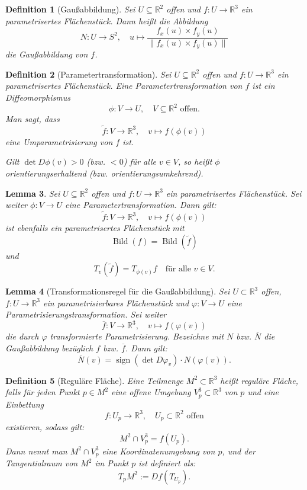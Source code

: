 \documentclass[a4paper,12pt]{article}
\theoremstyle{break}
\newtheorem{definition}{Definition}[section]
\newtheorem{lemma}[definition]{Lemma}
\begin{document}
\begin{definition}[Gaußabbildung]
    Sei \( U \subseteq \mathbb{R}^2 \) offen und \( f: U \to \mathbb{R}^3 \) ein parametrisertes Flächenstück. 
    Dann heißt die Abbildung
    \[
        N: U \to S^2, \quad u \mapsto \frac{f_x(u) \times f_y(u)}{\| f_x(u) \times f_y(u) \|}
    \]
    die \emph{Gaußabbildung} von \( f \).
\end{definition}

\begin{definition}[Parametertransformation]
    Sei \( U \subseteq \mathbb{R}^2 \) offen und \( f: U \to \mathbb{R}^3 \) ein parametrisertes Flächenstück. 
    Eine \emph{Parametertransformation} von \( f \) ist ein Diffeomorphismus 
    \[
        \phi: V \to U, \quad V \subseteq \mathbb{R}^2 \text{ offen}.
    \]
    Man sagt, dass 
    \[
        \tilde{f}: V \to \mathbb{R}^3, \quad v \mapsto f(\phi(v))
    \]
    eine \emph{Umparametrisierung} von \( f \) ist.
    
    Gilt \( \det D\phi(v) > 0 \) (bzw. \( < 0 \)) für alle \( v \in V \), so heißt \( \phi \) \emph{orientierungserhaltend} (bzw. \emph{orientierungsumkehrend}).
\end{definition}

\begin{lemma}
    Sei \( U \subseteq \mathbb{R}^2 \) offen und \( f: U \to \mathbb{R}^3 \) ein parametrisertes Flächenstück.
    Sei weiter \( \phi: V \to U \) eine Parametertransformation. Dann gilt:
    \[
        \tilde{f}: V \to \mathbb{R}^3, \quad v \mapsto f(\phi(v))
    \]
    ist ebenfalls ein parametrisertes Flächenstück mit 
    \[
        \operatorname{Bild}(f) = \operatorname{Bild}(\tilde{f})
    \]
    und 
    \[
        T_v(\tilde{f}) = T_{\phi(v)} f \quad \text{für alle } v \in V.
    \]
\end{lemma}

\begin{lemma}[Transformationsregel für die Gaußabbildung]
Sei $U \subset \mathbb{R}^3$ offen, $f: U \to \mathbb{R}^3$ ein parametrisierbares Flächenstück und $\varphi: V \to U$ eine Parametrisierungstransformation. Sei weiter 
\[
\overline{f}: V \to \mathbb{R}^3, \quad v \mapsto f(\varphi(v))
\]
die durch $\varphi$ transformierte Parametrisierung. Bezeichne mit $N$ bzw. $\overline{N}$ die Gaußabbildung bezüglich $f$ bzw. $\overline{f}$. Dann gilt:
\[
\overline{N}(v) = \operatorname{sign}(\det D\varphi_v) \cdot N(\varphi(v)).
\]
\end{lemma}

\begin{definition}[Reguläre Fläche]
Eine Teilmenge $M^2 \subset \mathbb{R}^3$ heißt \emph{reguläre Fläche}, falls für jeden Punkt $p \in M^2$ eine offene Umgebung $V_p^3 \subset \mathbb{R}^3$ von $p$ und eine Einbettung 
\[
f: U_p \to \mathbb{R}^3, \quad U_p \subset \mathbb{R}^2 \text{ offen}
\]
existieren, sodass gilt:
\[
M^2 \cap V_p^3 = f(U_p).
\]
Dann nennt man $M^2 \cap V_p^3$ eine \emph{Koordinatenumgebung} von $p$, und der Tangentialraum von $M^2$ im Punkt $p$ ist definiert als:
\[
T_p M^2 := Df(T_{U_p}).
\]
\end{definition}
\end{document}

